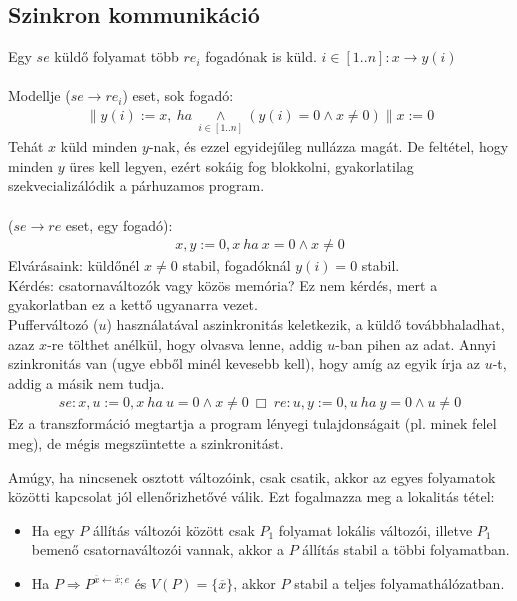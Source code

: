 \documentclass{article}
\begin{document}
\subsection*{Szinkron kommunikáció}
Egy $se$ küldő folyamat több $re_i$ fogadónak is küld. $i \in [1..n] : x \rightarrow y(i)$
\\
\\
Modellje ($se \rightarrow re_i$) eset, sok fogadó:
\\
\begin{align*}
\parallel y(i) := x,\ ha\ \underset{i \in [1..n]}{\land} (y(i)=0 \land x \neq 0) \parallel x:=0
\end{align*}
Tehát $x$ küld minden $y$-nak, és ezzel egyidejűleg nullázza magát. De feltétel, hogy minden $y$ üres kell legyen, ezért sokáig fog blokkolni, gyakorlatilag szekvecializálódik a párhuzamos program.
\\
\\
($se \rightarrow re$ eset, egy fogadó):
\begin{align*}
x,y:=0, x\ ha\ x=0 \land x \ne 0
\end{align*}
Elvárásaink: küldőnél $x \neq 0$ stabil, fogadóknál $y(i) =0$ stabil.\\
Kérdés: csatornaváltozók vagy közös memória? Ez nem kérdés, mert a gyakorlatban ez a kettő ugyanarra vezet.\\
Pufferváltozó ($u$) használatával aszinkronitás keletkezik, a küldő továbbhaladhat, azaz $x$-re tölthet anélkül, hogy olvasva lenne, addig $u$-ban pihen az adat. Annyi szinkronitás van (ugye ebből minél kevesebb kell), hogy amíg az egyik írja az $u$-t, addig a másik nem tudja.
\begin{align*}
se:x,u:=0,x\ ha\ u=0 \land x \neq 0\ \Box\ re: u,y:=0,u\ ha\ y=0 \land u \neq 0
\end{align*}
Ez a transzformáció megtartja a program lényegi tulajdonságait (pl. minek felel meg), de mégis megszüntette a szinkronitást.

Amúgy, ha nincsenek osztott változóink, csak csatik, akkor az egyes folyamatok közötti kapcsolat jól ellenőrizhetővé válik.
Ezt fogalmazza meg a lokalitás tétel:
\begin{itemize}
\item Ha egy $P$ állítás változói között csak $P_1$ folyamat lokális változói, illetve $P_1$ bemenő csatornaváltozói vannak, akkor a $P$ állítás stabil a többi folyamatban.
\item Ha $P \Rightarrow P^{\overline{x}\leftarrow\overline{x};e}$ és $V(P)=\lbrace\overline{x}\rbrace$, akkor $P$ stabil a teljes folyamathálózatban.
\end{itemize}
\end{document}
